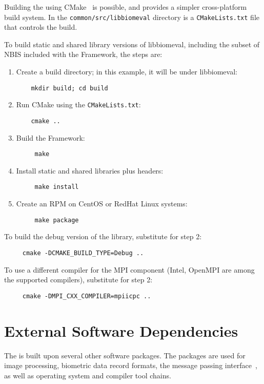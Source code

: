 Building the \sname using CMake~\cite{org:cmake} is possible, and provides
a simpler cross-platform build system. In the {\tt common/src/libbiomeval}
directory is a {\tt CMakeLists.txt} file that controls the build. 

To build static and shared library versions of libbiomeval, including the
subset of NBIS included with the Framework, the steps are:
\begin{enumerate}
\item Create a build directory; in this example, it will be under libbiomeval:
\begin{verbatim}
    mkdir build; cd build
\end{verbatim}
\item Run CMake using the {\tt CMakeLists.txt}:
\begin{verbatim}
    cmake ..
\end{verbatim}
\item Build the Framework:
\begin{verbatim}
     make
\end{verbatim}
\item Install static and shared libraries plus headers:
\begin{verbatim}
     make install
\end{verbatim}
\item Create an RPM on CentOS or RedHat Linux systems:
\begin{verbatim}
     make package
\end{verbatim}
\end{enumerate}

To build the debug version of the library, substitute for step 2:
\begin{verbatim}
     cmake -DCMAKE_BUILD_TYPE=Debug ..
\end{verbatim}

To use a different compiler for the MPI component (Intel, OpenMPI are among
 the supported compilers), substitute for step 2:
\begin{verbatim}
     cmake -DMPI_CXX_COMPILER=mpiicpc ..
\end{verbatim}

\section{External Software Dependencies}

The \lname is built upon several other software packages. The packages are
used for image processing, biometric data record formats, the message
passing interface~\cite{mpi}, as well as operating system and compiler
tool chains.

